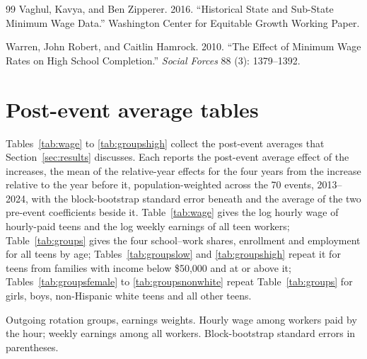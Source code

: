\documentclass[12pt]{article}
\begin{document}
\begin{thebibliography}{99}
 Vaghul, Kavya, and Ben Zipperer. 2016. ``Historical State and Sub-State Minimum Wage Data.'' Washington Center for Equitable Growth Working Paper.

 Warren, John Robert, and Caitlin Hamrock. 2010. ``The Effect of Minimum Wage Rates on High School Completion.'' \textit{Social Forces} 88 (3): 1379--1392.

\end{thebibliography}

\clearpage
\appendix
\section{Post-event average tables}\label{app:tables}

Tables~\ref{tab:wage} to \ref{tab:groupshigh} collect the post-event averages that Section~\ref{sec:results} discusses. Each reports the post-event average effect of the increases, the mean of the relative-year effects for the four years from the increase relative to the year before it, population-weighted across the 70 events, 2013--2024, with the block-bootstrap standard error beneath and the average of the two pre-event coefficients beside it. Table~\ref{tab:wage} gives the log hourly wage of hourly-paid teens and the log weekly earnings of all teen workers; Table~\ref{tab:groups} gives the four school--work shares, enrollment and employment for all teens by age; Tables~\ref{tab:groupslow} and \ref{tab:groupshigh} repeat it for teens from families with income below \$50,000 and at or above it; Tables~\ref{tab:groupsfemale} to \ref{tab:groupsnonwhite} repeat Table~\ref{tab:groups} for girls, boys, non-Hispanic white teens and all other teens.

\begin{table}[H]
\centering
\caption{Effects of minimum wage increases on teen wages and earnings: post-event averages, 70 events, 2013--2024}
\label{tab:wage}
\small

\begin{tablenotes}\footnotesize
\item Outgoing rotation groups, earnings weights. Hourly wage among workers paid by the hour; weekly earnings among all workers. Block-bootstrap standard errors in parentheses.
\end{tablenotes}
\end{table}
\end{document}
